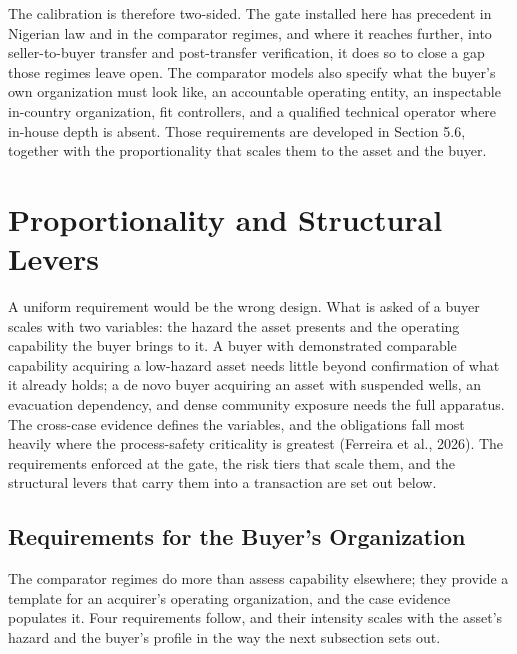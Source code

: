 \documentclass[twoside,fontset=lmodern]{mitthesis}
\begin{document}
The calibration is therefore two-sided. The gate installed here has
precedent in Nigerian law and in the comparator regimes, and where it
reaches further, into seller-to-buyer transfer and post-transfer
verification, it does so to close a gap those regimes leave open. The
comparator models also specify what the buyer's own organization must
look like, an accountable operating entity, an inspectable in-country
organization, fit controllers, and a qualified technical operator where
in-house depth is absent. Those requirements are developed in Section
5.6, together with the proportionality that scales them to the asset and
the buyer.

\hypertarget{proportionality-and-structural-levers}{%
\section{Proportionality and Structural
Levers}\label{proportionality-and-structural-levers}}

A uniform requirement would be the wrong design. What is asked of a
buyer scales with two variables: the hazard the asset presents and the
operating capability the buyer brings to it. A buyer with demonstrated
comparable capability acquiring a low-hazard asset needs little beyond
confirmation of what it already holds; a de novo buyer acquiring an
asset with suspended wells, an evacuation dependency, and dense
community exposure needs the full apparatus. The cross-case evidence
defines the variables, and the obligations fall most heavily where the
process-safety criticality is greatest (Ferreira et al., 2026). The
requirements enforced at the gate, the risk tiers that scale them, and
the structural levers that carry them into a transaction are set out
below.

\hypertarget{requirements-for-the-buyers-organization}{%
\subsection{Requirements for the Buyer's
Organization}\label{requirements-for-the-buyers-organization}}

The comparator regimes do more than assess capability elsewhere; they
provide a template for an acquirer's operating organization, and the
case evidence populates it. Four requirements follow, and their
intensity scales with the asset's hazard and the buyer's profile in the
way the next subsection sets out.
\end{document}
